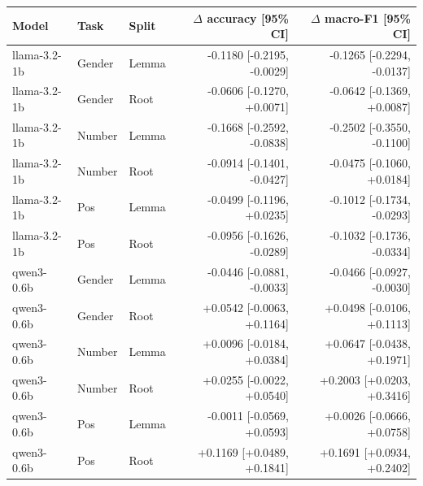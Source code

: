 \begin{tabular}{lllrr}
\toprule
Model & Task & Split & $\Delta$ accuracy [95\% CI] & $\Delta$ macro-F1 [95\% CI] \\
\midrule
llama-3.2-1b & Gender & Lemma & -0.1180 [-0.2195, -0.0029] & -0.1265 [-0.2294, -0.0137] \\
llama-3.2-1b & Gender & Root & -0.0606 [-0.1270, +0.0071] & -0.0642 [-0.1369, +0.0087] \\
llama-3.2-1b & Number & Lemma & -0.1668 [-0.2592, -0.0838] & -0.2502 [-0.3550, -0.1100] \\
llama-3.2-1b & Number & Root & -0.0914 [-0.1401, -0.0427] & -0.0475 [-0.1060, +0.0184] \\
llama-3.2-1b & Pos & Lemma & -0.0499 [-0.1196, +0.0235] & -0.1012 [-0.1734, -0.0293] \\
llama-3.2-1b & Pos & Root & -0.0956 [-0.1626, -0.0289] & -0.1032 [-0.1736, -0.0334] \\
qwen3-0.6b & Gender & Lemma & -0.0446 [-0.0881, -0.0033] & -0.0466 [-0.0927, -0.0030] \\
qwen3-0.6b & Gender & Root & +0.0542 [-0.0063, +0.1164] & +0.0498 [-0.0106, +0.1113] \\
qwen3-0.6b & Number & Lemma & +0.0096 [-0.0184, +0.0384] & +0.0647 [-0.0438, +0.1971] \\
qwen3-0.6b & Number & Root & +0.0255 [-0.0022, +0.0540] & +0.2003 [+0.0203, +0.3416] \\
qwen3-0.6b & Pos & Lemma & -0.0011 [-0.0569, +0.0593] & +0.0026 [-0.0666, +0.0758] \\
qwen3-0.6b & Pos & Root & +0.1169 [+0.0489, +0.1841] & +0.1691 [+0.0934, +0.2402] \\
\bottomrule
\end{tabular}
